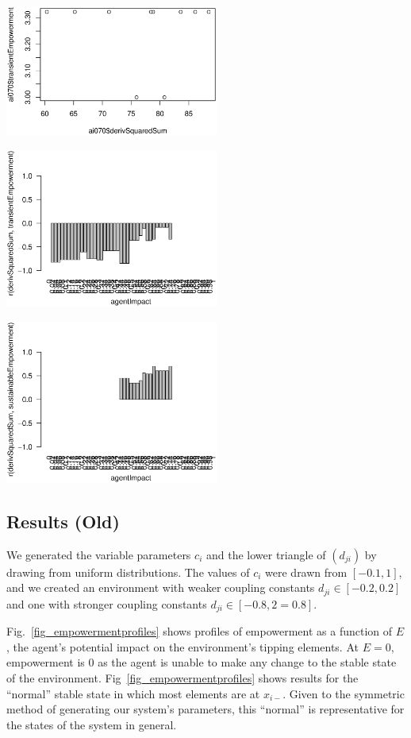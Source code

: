 \documentclass[conference]{IEEEtran}
\newcommand{\couplingconstant}{\ensuremath{d}}
\newcommand{\impactstrength}{\ensuremath{E}}
\begin{document}
\centerline{\includegraphics[width=7cm]{n08_chain_large_corr_dss_emp_ai070.eps}}

\centerline{\includegraphics[width=7cm]{n08_chain_large_corr_dss_emp.eps}}

\centerline{\includegraphics[width=7cm]{n08_chain_large_corr_dss_empsust.eps}}


\cleardoublepage


\subsection{Results (Old)}

We generated the variable parameters $c_i$ and the lower triangle of
$(\couplingconstant_{ji})$ by drawing from uniform distributions. The values of $c_i$
were drawn from $[-0.1, 1]$, and we created an environment with weaker
coupling constants $\couplingconstant_{ji} \in [-0.2, 0.2]$ and one with stronger
coupling constants $\couplingconstant_{ji} \in [-0.8, 2=0.8]$.

Fig.~\ref{fig_empowermentprofiles} shows profiles of empowerment as a
function of $\impactstrength$, the agent's potential impact on the environment's
tipping elements. At $\impactstrength = 0$, empowerment is $0$ as the agent is
unable to make any change to the stable state of the environment.
Fig~\ref{fig_empowermentprofiles} shows results for the ``normal''
stable state in which most elements are at $x_{i-}$. Given to the
symmetric method of generating our system's parameters, this
``normal'' is representative for the states of the system in general.
\end{document}
